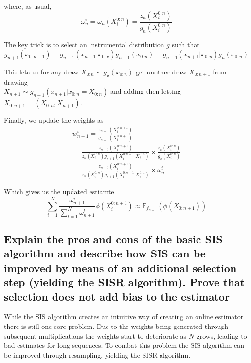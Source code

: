 \documentclass[a4paper]{article}
\begin{document}
where, as usual,
\begin{equation}
    \omega_n^i = \omega_n(X_i^{0:n}) = \frac{z_n(X_i^{0:n})}{g_n(X_i^{0:n})}
\end{equation}

The key trick is to select an instrumental distribution $g$ such that
\begin{equation}
    g_{n+1}(x_{0:n+1}) = g_{n+1}(x_{n+1}|x_{0:n})g_{n+1}(x_{0:n}) = g_{n+1}(x_{n+1}|x_{0:n})g_n(x_{0:n})
\end{equation}

This lets us for any draw $X_{0:n} \sim g_n(x_{0:n})$ get another draw $X_{0:n+1}$ from drawing \\ $X_{n+1} \sim g_{n+1}(x_{n+1}|x_{0:n} = X_{0:n})$ and adding then letting $X_{0:n+1} = (X_{0:n}, X_{n+1})$.

Finally, we update the weights as 
\begin{equation}
    \begin{gathered}
        w_{n+1}^i = \frac{z_{n+1}(X_i^{0:n+1})}{g_{n+1}(X_i^{0:n+1})} \\
        = \frac{z_{n+1}(X_i^{0:n+1})}{z_{n}(X_i^{0:n})g_{n+1}(X_i^{0:n+1}|X_i^{0:n})} \times \frac{z_{n}(X_i^{0:n})}{g_{n}(X_i^{0:n})} \\
        = \frac{z_{n+1}(X_i^{0:n+1})}{z_{n}(X_i^{0:n})g_{n+1}(X_i^{0:n+1}|X_i^{0:n})} \times \omega_n^i
    \end{gathered}
\end{equation}

Which gives us the updated estiamte 
\begin{equation}
    \sum_{i=1}^N\frac{\omega_{n+1}^i}{\sum_{l=1}^N\omega_{n+1}^l}\phi(X_i^{0:n+1}) \approx \mathbb{E}_{f_{n+1}}(\phi(X_{0:n+1}))
\end{equation}

\newpage

\subsection[Sequential Importance Sampling with Resampling]{Explain the pros and cons of the basic SIS algorithm and describe how SIS can be improved by means of an additional selection step (yielding the SISR algorithm). Prove that selection does not add bias to the estimator}

While the SIS algorithm creates an intuitive way of creating an online estimator there is still one core problem. Due to the weights being generated through subsequent multiplications the weights start to deteriorate as $N$ grows, leading to bad estimates for long sequences. To combat this problem the SIS algorithm can be improved through resampling, yielding the SISR algorithm.
\end{document}
